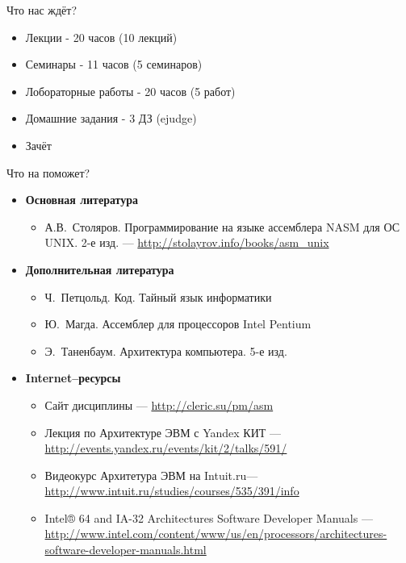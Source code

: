 \documentclass{beamer}
\begin{document}
    \begin{frame}{Что нас ждёт?}
        \begin{itemize}
            \item Лекции - 20 часов (10 лекций)
            \item Семинары - 11 часов (5 семинаров)
            \item Лобораторные работы - 20 часов (5 работ)
            \item Домашние задания - 3 ДЗ (ejudge)
            \item Зачёт
        \end{itemize}
    \end{frame}
    \begin{frame}{Что на поможет?}
        \begin{itemize}
            \item {\bf Основная литература}
            \begin{itemize}
                \item А.В.~Столяров. Программирование на языке ассемблера NASM для ОС UNIX. 2-е изд. --- \url{http://stolayrov.info/books/asm_unix}
            \end{itemize}
            \item {\bf Дополнительная литература}
            \begin{itemize}
                \item Ч.~Петцольд. Код. Тайный язык информатики
                \item Ю.~Магда. Ассемблер для процессоров Intel Pentium
                \item Э.~Таненбаум. Архитектура компьютера. 5-е изд.
            \end{itemize}
            \item {\bf Internet--ресурсы}
            \begin{itemize}
                \item Сайт дисциплины --- \url{http://cleric.su/pm/asm}
                \item Лекция по Архитектуре ЭВМ с Yandex КИТ --- \url{http://events.yandex.ru/events/kit/2/talks/591/}
                \item Видеокурс Архитетура ЭВМ на Intuit.ru--- \url{http://www.intuit.ru/studies/courses/535/391/info}
                \item Intel® 64 and IA-32 Architectures Software Developer Manuals --- \url{http://www.intel.com/content/www/us/en/processors/architectures-software-developer-manuals.html}
            \end{itemize}
        \end{itemize}
    \end{frame}
\end{document}

